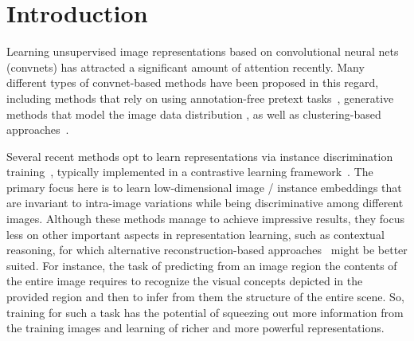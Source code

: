 \documentclass[final]{cvpr}
\begin{document}
\section{Introduction}

Learning unsupervised image representations based on convolutional neural nets (convnets) has attracted a significant amount of attention recently. Many different types of convnet-based methods have been proposed in this regard, including methods that rely on using annotation-free pretext tasks~\cite{doersch2015unsupervised,gidaris2018unsupervised,larsson2016learning,noroozi2016unsupervised,pathak2016context,zhang2016colorful}, generative methods that model the image data distribution \cite{donahue2017adversarial,donahue2019large,dumoulin2017adversarially}, as well as clustering-based approaches~\cite{asano2019selflabelling,caron2018deep,caron2019unsupervised}. 

Several recent methods opt to learn representations via instance discrimination training~\cite{chen2020simple, dosovitskiy2014discriminative, he2020momentum, wu2018unsupervised}, typically implemented in a contrastive learning framework~\cite{chopra2005, hadsell2006dimensionality}.
The primary focus here is to learn low-dimensional image / instance embeddings that are invariant to intra-image variations while being discriminative among different images.
Although these methods manage to achieve impressive results, 
they focus less on other important aspects in representation learning, such as contextual reasoning, for which alternative reconstruction-based approaches~\cite{dapogny2020aaai, pathak2016context, zhang2016colorful, zhang2017split} might be better suited.
For instance, the task of predicting from an image region the contents of the entire image requires to recognize the visual concepts depicted in the provided region and then to infer from them the structure of the entire scene.
So, training for such a task has the potential of squeezing out more information from the training images and learning of richer and more powerful representations. 
\end{document}
